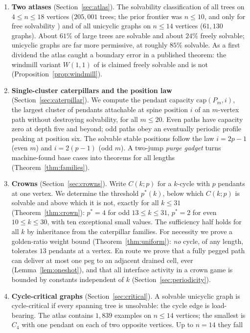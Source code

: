 \documentclass[11pt]{article}
\theoremstyle{definition}
\newcommand{\cp}{\mathrm{cap}}
\begin{document}
\begin{enumerate}
\item \textbf{Two atlases} (Section~\ref{sec:atlas}). The solvability
classification of all trees on $4\le n\le 18$ vertices ($205{,}001$
trees; the prior frontier was $n\le 10$, and only for free
solvability \cite{BG13}) and of all unicyclic graphs on $n\le 14$
vertices ($61{,}130$ graphs). About $61\%$ of large trees are
solvable and about $24\%$ freely solvable; unicyclic graphs are far
more permissive, at roughly $85\%$ solvable. As a first dividend the
atlas caught a boundary error in a published theorem: the windmill
variant $W(1,1)$ of \cite{BH12} is claimed freely solvable and is
not (Proposition~\ref{prop:windmill}).
\item \textbf{Single-cluster caterpillars and the position law}
(Section~\ref{sec:caterpillar}). We compute the pendant capacity
$\cp(P_m,i)$, the largest cluster of pendants attachable at spine
position $i$ of an $m$-vertex path without destroying solvability,
for all $m\le 20$. Even paths have capacity zero at depth five and
beyond; odd paths obey an eventually periodic profile peaking at
position six. The solvable stable positions follow the law $i=2p-1$
(even $m$) and $i=2(p-1)$ (odd $m$). A two-jump \emph{purge gadget}
turns machine-found base cases into theorems for all lengths
(Theorem~\ref{thm:families}).
\item \textbf{Crowns} (Section~\ref{sec:crowns}). Write $C(k;p)$ for
a $k$-cycle with $p$ pendants at one vertex. We determine the
threshold $p^*(k)$, below which $C(k;p)$ is solvable and above which
it is not, exactly for all $k\le 31$
(Theorem~\ref{thm:crown}): $p^*=4$ for odd $13\le k\le 31$, $p^*=2$
for even $10\le k\le 30$, with ten exceptional small values. The
sufficiency half holds for all $k$ by inheritance from the
caterpillar families. For necessity we prove a golden-ratio weight
bound (Theorem~\ref{thm:uniform}): \emph{no} cycle, of any length,
tolerates $13$ pendants at a vertex. En route we prove that a
fully pegged path can deliver at most one peg to an adjacent drained
cell, ever (Lemma~\ref{lem:oneshot}), and that all interface
activity in a crown game is bounded by constants independent of $k$
(Section~\ref{sec:periodicity}).
\item \textbf{Cycle-critical graphs} (Section~\ref{sec:critical}). A
solvable unicyclic graph is cycle-critical if every spanning tree is
unsolvable: the cycle edge is load-bearing. The atlas contains
$1{,}839$ examples on $n\le 14$ vertices; the smallest is $C_4$ with
one pendant on each of two opposite vertices. Up to $n=14$ they fall

\end{enumerate}
\end{document}
